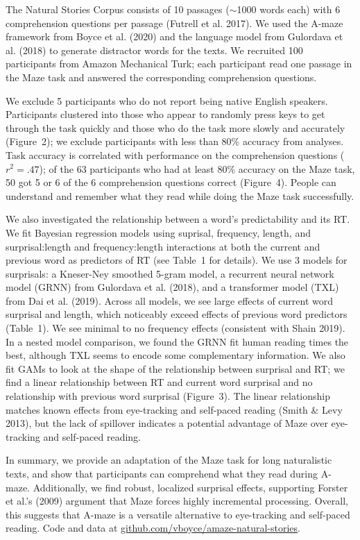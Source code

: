 \documentclass[11pt,a4paper]{article}
\begin{document}
The Natural Stories Corpus consists of 10 passages ($\sim$1000 words each) with 6 comprehension questions per passage (Futrell et al. 2017). We used the A-maze framework from Boyce et al. (2020) and the language model from Gulordava et al. (2018) to generate distractor words for the texts. We recruited 100 participants from Amazon Mechanical Turk; each participant read one passage in the Maze task and answered the corresponding comprehension questions. 

We exclude 5 participants who do not report being native English speakers. Participants clustered into those who appear to randomly press keys to get through the task quickly and those who do the task more slowly and accurately (Figure~2); we exclude participants with less than 80\% accuracy from analyses. Task accuracy is correlated with performance on the comprehension questions ($r^2=.47$); of the 63 participants who had at least 80\% accuracy on the Maze task, 50 got 5 or 6 of the 6 comprehension questions correct (Figure~4). People can understand and remember what they read while doing the Maze task successfully.

We also investigated the relationship between a word's predictability and its RT. We fit Bayesian regression models using suprisal, frequency, length, and surprisal:length and frequency:length interactions at both the current and previous word as predictors of RT (see Table~1 for details). We use 3 models for surprisals: a Kneser-Ney smoothed 5-gram model, a recurrent neural network model (GRNN) from Gulordava et al. (2018), and a transformer model (TXL) from Dai et al. (2019). Across all models, we see large effects of current word surprisal and length, which noticeably exceed effects of previous word predictors (Table~1). We see minimal to no frequency effects (consistent with Shain 2019). In a nested model comparison, we found the GRNN fit human reading times the best, although TXL seems to encode some complementary information. We also fit GAMs to look at the shape of the relationship between surprisal and RT; we find a linear relationship between RT and current word surprisal and no relationship with previous word surprisal (Figure~3). The linear relationship matches known effects from eye-tracking and self-paced reading (Smith \& Levy 2013), but the lack of spillover indicates a potential advantage of Maze over eye-tracking and self-paced reading.


In summary, we provide an adaptation of the Maze task for long naturalistic texts, and show that participants can comprehend what they read during A-maze. Additionally, we find robust, localized surprisal effects, supporting Forster et al.'s (2009) argument that Maze forces highly incremental processing. Overall, this suggests that A-maze is a versatile alternative to eye-tracking and self-paced reading. Code and data at \url{github.com/vboyce/amaze-natural-stories}. 
\end{document}
